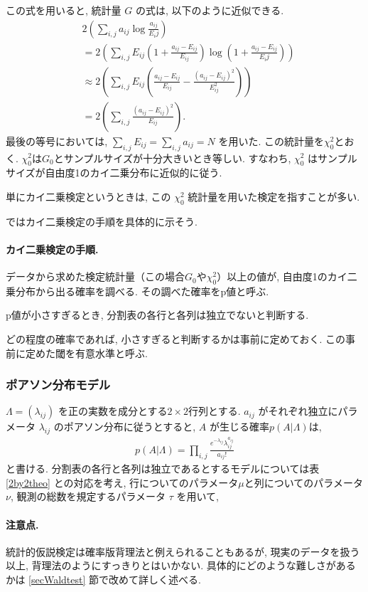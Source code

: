 \documentclass[a4paper, 12pt]{jarticle}
\begin{document}
この式を用いると, 統計量 $G$ の式は, 以下のように近似できる.
\begin{align}
&2 \left(\sum_{i,j} a_{ij}\log\frac{a_{ij}}{E_ij} \right)\\
&=2 \left(\sum_{i,j} E_{ij} \left(1+ \frac{a_{ij}-E_{ij}}{E_{ij}}\right)\log\left(1+ \frac{a_{ij}-E_{ij}}{E_ij} \right)\right)\\
&\approx 2 \left(\sum_{i,j} E_{ij}\left(  \frac{a_{ij}-E_{ij}}{E_{ij}}- \frac{(a_{ij}-E_{ij})^2}{E_{ij}^2} \right)\right) \\
&= 2 \left(\sum_{i,j} \frac{(a_{ij}-E_{ij})^2}{E_{ij}} \right).
\end{align}
最後の等号においては, $\sum_{i,j} E_{ij} =\sum_{i,j} a_{ij} = N$ を用いた.
この統計量を$\chi^2_0$とおく. 
$\chi^2_0$は$G_0$とサンプルサイズが十分大きいとき等しい.
すなわち, $\chi^2_0$ はサンプルサイズが自由度1のカイ二乗分布に近似的に従う.

単にカイ二乗検定というときは, この $\chi^2_0$ 統計量を用いた検定を指すことが多い. 

ではカイ二乗検定の手順を具体的に示そう. 

\paragraph{カイ二乗検定の手順.}
データから求めた検定統計量（この場合$G_0$や$\chi^2_0$）以上の値が, 自由度1のカイ二乗分布から出る確率を調べる. その調べた確率をp値と呼ぶ.

p値が小さすぎるとき, 分割表の各行と各列は独立でないと判断する.

どの程度の確率であれば, 小さすぎると判断するかは事前に定めておく. この事前に定めた閾を有意水準と呼ぶ.

\subsubsection{ポアソン分布モデル}
$\Lambda = (\lambda_{ij})$ を正の実数を成分とする$2 \times 2$行列とする. 
$a_{ij}$ がそれぞれ独立にパラメータ $\lambda_{ij}$ のポアソン分布に従うとすると, $A$ が生じる確率$p(A|\Lambda)$は, 
\begin{align}
p(A|\Lambda) = 
\prod_{i,j} \frac{e^{-\lambda_{ij}} \lambda_{ij}^{a_{ij}}}{a_{ij}!}
\end{align}
と書ける. 
分割表の各行と各列は独立であるとするモデルについては表\ref{2by2theo} との対応を考え, 行についてのパラメータ$\mu$と列についてのパラメータ$\nu$,  観測の総数を規定するパラメータ $\tau$ を用いて, 

\paragraph{注意点.}
統計的仮説検定は確率版背理法と例えられることもあるが, 現実のデータを扱う以上, 背理法のようにすっきりとはいかない. 
具体的にどのような難しさがあるかは \ref{secWaldtest} 節で改めて詳しく述べる. 
\end{document}
